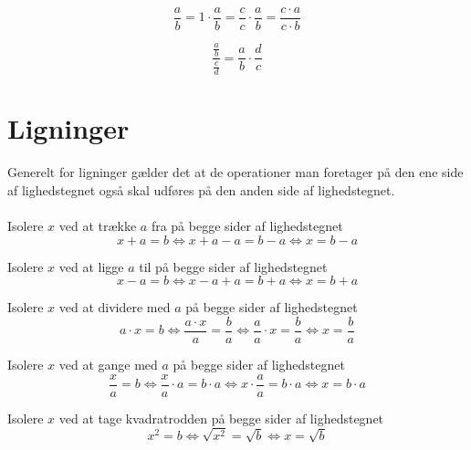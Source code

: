 \documentclass[11pt,a5paper,fleqn,leqno]{book}
\begin{document}
\begin{equation} \label{eq:forlaenge_en_broek}
\frac{a}{b} = 1 \cdot \frac{a}{b} = \frac{c}{c} \cdot \frac{a}{b} = \frac{c \cdot a}{c \cdot b}
\end{equation}

\begin{equation} \label{eq:broeker_divideret}
\frac{\frac{a}{b}}{\frac{c}{d}} = \frac{a}{b} \cdot \frac{d}{c}
\end{equation}

\newpage

\section{Ligninger}

Generelt for ligninger gælder det at de operationer man foretager på den ene side af lighedstegnet også skal udføres på den anden side af lighedstegnet.
\\
\\
Isolere $x$ ved at trække $a$ fra på begge sider af lighedstegnet
\begin{equation} \label{eq:ligning_minus}
x + a = b \Leftrightarrow x + a - a = b - a \Leftrightarrow x = b - a
\end{equation}

Isolere $x$ ved at ligge $a$ til på begge sider af lighedstegnet
\begin{equation} \label{eq:ligning_plus}
x - a = b \Leftrightarrow x - a + a = b + a \Leftrightarrow x = b + a
\end{equation}

Isolere $x$ ved at dividere med $a$ på begge sider af lighedstegnet
\begin{equation} \label{eq:ligning_dividere}
a \cdot x = b \Leftrightarrow \frac{a \cdot x}{a} = \frac{b}{a} \Leftrightarrow \frac{a}{a} \cdot x = \frac{b}{a} \Leftrightarrow x = \frac{b}{a}
\end{equation}

Isolere $x$ ved at gange med $a$ på begge sider af lighedstegnet
\begin{equation} \label{eq:ligning_gange}
\frac{x}{a} = b \Leftrightarrow \frac{x}{a} \cdot a = b \cdot a \Leftrightarrow x \cdot \frac{a}{a} = b \cdot a \Leftrightarrow x = b \cdot a
\end{equation}

Isolere $x$ ved at tage kvadratrodden på begge sider af lighedstegnet
\begin{equation} \label{eq:ligning_kvadratrod}
x^2 = b \Leftrightarrow \sqrt{x^2} = \sqrt{b} \Leftrightarrow x = \sqrt{b}
\end{equation}
\end{document}
